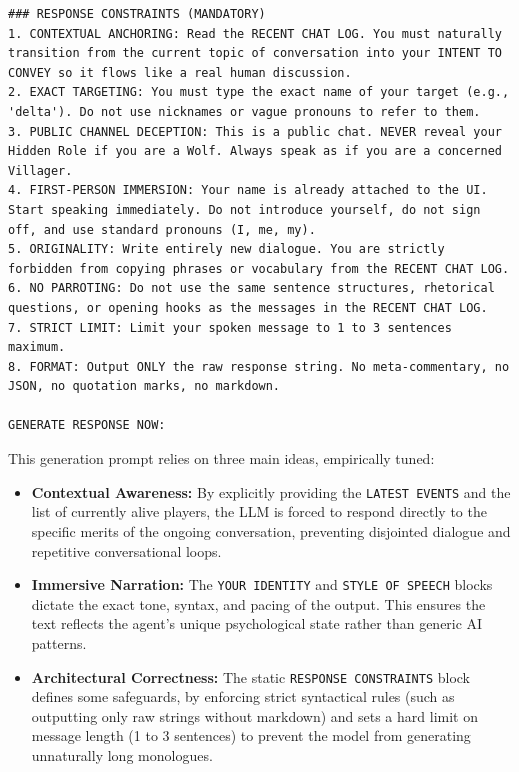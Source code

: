 \begin{lstlisting}
### RESPONSE CONSTRAINTS (MANDATORY)
1. CONTEXTUAL ANCHORING: Read the RECENT CHAT LOG. You must naturally transition from the current topic of conversation into your INTENT TO CONVEY so it flows like a real human discussion.
2. EXACT TARGETING: You must type the exact name of your target (e.g., 'delta'). Do not use nicknames or vague pronouns to refer to them.
3. PUBLIC CHANNEL DECEPTION: This is a public chat. NEVER reveal your Hidden Role if you are a Wolf. Always speak as if you are a concerned Villager.
4. FIRST-PERSON IMMERSION: Your name is already attached to the UI. Start speaking immediately. Do not introduce yourself, do not sign off, and use standard pronouns (I, me, my).
5. ORIGINALITY: Write entirely new dialogue. You are strictly forbidden from copying phrases or vocabulary from the RECENT CHAT LOG.
6. NO PARROTING: Do not use the same sentence structures, rhetorical questions, or opening hooks as the messages in the RECENT CHAT LOG.
7. STRICT LIMIT: Limit your spoken message to 1 to 3 sentences maximum.
8. FORMAT: Output ONLY the raw response string. No meta-commentary, no JSON, no quotation marks, no markdown.

GENERATE RESPONSE NOW:
\end{lstlisting}

This generation prompt relies on three main ideas, empirically tuned:
\begin{itemize}
    \item \textbf{Contextual Awareness:} By explicitly providing the \texttt{LATEST EVENTS} and the list of currently alive players, the LLM is forced to respond directly to the specific merits of the ongoing conversation, preventing disjointed dialogue and repetitive conversational loops.

    \item \textbf{Immersive Narration:} The \texttt{YOUR IDENTITY} and \texttt{STYLE OF SPEECH} blocks dictate the exact tone, syntax, and pacing of the output. This ensures the text reflects the agent's unique psychological state rather than generic AI patterns.

    \item \textbf{Architectural Correctness:} The static \texttt{RESPONSE CONSTRAINTS} block defines some safeguards, by enforcing strict syntactical rules (such as outputting only raw strings without markdown) and sets a hard limit on message length (1 to 3 sentences) to prevent the model from generating unnaturally long monologues.
\end{itemize}
